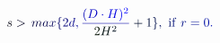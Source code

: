 \documentclass[12pt]{article}
\begin{document}
\makeatletter
\renewcommand*{\@textcolor}[3]{%
  \protect\leavevmode
  \begingroup
    \color#1{#2}#3%
  \endgroup
}
\makeatother
\begin{displaymath}
\mathcolor[RGB]{0,0,15}{s} \mathcolor[RGB]{0,0,30}{>} \mathcolor[RGB]{0,0,45}{\operatorname*} { \mathcolor[RGB]{0,0,60}{m} \mathcolor[RGB]{0,0,75}{a} \mathcolor[RGB]{0,0,90}{x} } \mathcolor[RGB]{0,0,105}{\{} \mathcolor[RGB]{0,0,120}{2} \mathcolor[RGB]{0,0,135}{d} \mathcolor[RGB]{0,0,150}{,} \mathcolor[RGB]{0,0,165}{\frac { \mathcolor[RGB]{0,0,180}{(} \mathcolor[RGB]{0,0,195}{D} \mathcolor[RGB]{0,0,210}{\cdot} \mathcolor[RGB]{0,0,225}{H} \mathcolor[RGB]{0,0,240}{)} ^ { \mathcolor[RGB]{0,0,255}{2} } } { \mathcolor[RGB]{0,15,0}{2} \mathcolor[RGB]{0,15,15}{H} ^ { \mathcolor[RGB]{0,15,30}{2} } } } \mathcolor[RGB]{0,15,45}{+} \mathcolor[RGB]{0,15,60}{1} \mathcolor[RGB]{0,15,75}{\}} \mathcolor[RGB]{0,15,90}{,} \mathrm { ~ \mathcolor[RGB]{0,15,105}{i} \mathcolor[RGB]{0,15,120}{f} ~ } \mathcolor[RGB]{0,15,135}{r} \mathcolor[RGB]{0,15,150}{=} \mathcolor[RGB]{0,15,165}{0} \mathcolor[RGB]{0,15,180}{.}
\end{displaymath}
\end{document}
